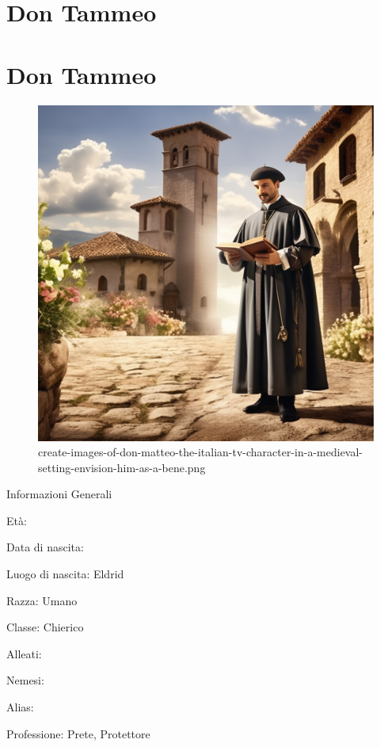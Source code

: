 \section{Don Tammeo}\label{don-tammeo}
\section{Don Tammeo}\label{don-tammeo-1}


\begin{figure}
\centering
\includegraphics{create-images-of-don-matteo-the-italian-tv-character-in-a-medieval-setting-envision-him-as-a-bene.png}
\caption{create-images-of-don-matteo-the-italian-tv-character-in-a-medieval-setting-envision-him-as-a-bene.png}
\end{figure}

Informazioni Generali

Età:

Data di nascita:

Luogo di nascita: Eldrid

Razza: Umano

Classe: Chierico

Alleati:

Nemesi:

Alias:

Professione: Prete, Protettore


